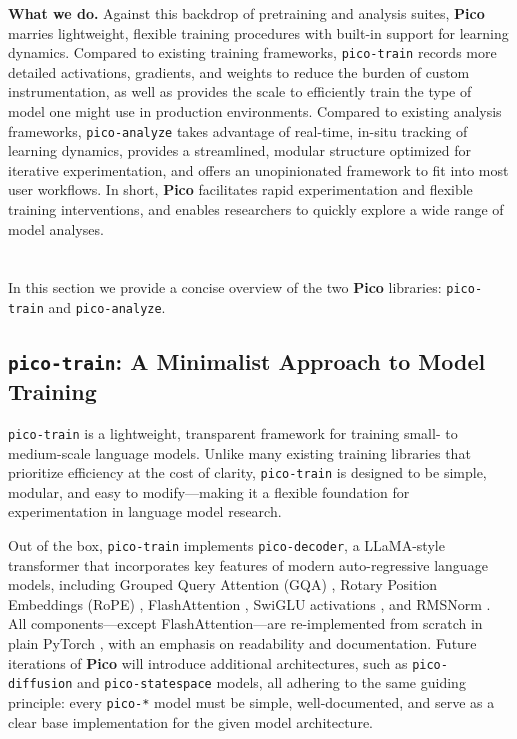 \textbf{What we do.} Against this backdrop of pretraining and analysis suites, \textbf{Pico} marries lightweight, flexible training procedures with built-in support for learning dynamics. Compared to existing training frameworks, \texttt{pico-train} records more detailed activations, gradients, and weights to reduce the burden of custom instrumentation, as well as provides the scale to efficiently train the type of model one might use in production environments. Compared to existing analysis frameworks, \texttt{pico-analyze} takes advantage of real-time, in-situ tracking of learning dynamics, provides a streamlined, modular structure optimized for iterative experimentation, and offers an unopinionated framework to fit into most user workflows. In short, \textbf{Pico} facilitates rapid experimentation and flexible training interventions, and enables researchers to quickly explore a wide range of model analyses.%

\section{\picolarge}

In this section we provide a concise overview of the two \textbf{Pico} libraries: \texttt{pico-train} and \texttt{pico-analyze}. 


\subsection{\texttt{pico-train}: A Minimalist Approach to Model Training}

\texttt{pico-train} is a lightweight, transparent framework for training small- to medium-scale language models. Unlike many existing training libraries that prioritize efficiency at the cost of clarity, \texttt{pico-train} is designed to be simple, modular, and easy to modify—making it a flexible foundation for experimentation in language model research.

Out of the box, \texttt{pico-train} implements \texttt{pico-decoder}, a LLaMA-style transformer \citep{touvron2023llama} that incorporates key features of modern auto-regressive language models, including Grouped Query Attention (GQA) \citep{ainslie2023gqa}, Rotary Position Embeddings (RoPE) \citep{su2024rope}, FlashAttention \citep{dao2022flashattention}, SwiGLU activations \citep{shazeer2020glu}, and RMSNorm \citep{zhang2019rms}. All components—except FlashAttention—are re-implemented from scratch in plain PyTorch \citep{paszke2017pytorch}, with an emphasis on readability and documentation. Future iterations of \textbf{Pico} will introduce additional architectures, such as \texttt{pico-diffusion} and \texttt{pico-statespace} models, all adhering to the same guiding principle: every \texttt{pico-*} model must be simple, well-documented, and serve as a clear base implementation for the given model architecture.

